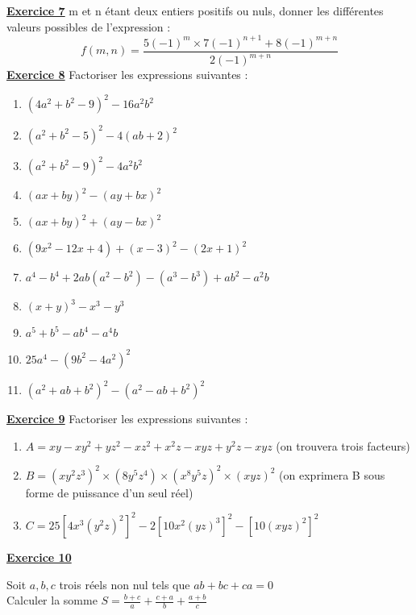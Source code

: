 \documentclass[12pt,a4paper]{article}
\newcommand{\exo}[1]{%
        \textbf{\underline{Exercice #1}}
}
\begin{document}
\exo{7} m et n étant deux entiers positifs ou nuls, donner les différentes valeurs possibles de l’expression :
\[
f(m,n) = \dfrac{5(-1)^m \times 7(-1)^{n+1} + 8(-1)^{m+n}}{2(-1)^{m+n}}
\]
\exo{8} Factoriser les expressions suivantes :
\begin{enumerate}
    \item $(4a^2 + b^2 - 9)^2 - 16a^2b^2$
    
    \item $(a^2 + b^2 - 5)^2 - 4(ab + 2)^2$
    
    \item $(a^2 + b^2 - 9)^2 - 4a^2b^2$
    
    \item $(ax + by)^2 - (ay + bx)^2$
    
    \item $(ax + by)^2 + (ay - bx)^2$
    
    \item $(9x^2 - 12x + 4) + (x - 3)^2 - (2x + 1)^2$
    
    \item $a^4 - b^4 + 2ab(a^2 - b^2) - (a^3 - b^3) + ab^2 - a^2b$
    
    \item $(x + y)^3 - x^3 - y^3$
    
    \item $a^5 + b^5 - ab^4 - a^4b$
    
    \item $25a^4 - (9b^2 - 4a^2)^2$
    
    \item $(a^2 + ab + b^2)^2 - (a^2 - ab + b^2)^2$
\end{enumerate}
\exo{9} Factoriser les expressions suivantes :

\begin{enumerate}
\item $A = xy - xy^2 + yz^2 - xz^2 + x^2z - xyz + y^2z - xyz$ (on trouvera trois facteurs)
    
    \item $B = (xy^2z^3)^2 \times (8y^5z^4) \times (x^8y^5z)^2 \times (xyz)^2$ 
    (on exprimera B sous forme de puissance d'un seul réel)
    
    \item $C = 25[4x^3(y^2z)^2]^2 - 2[10x^2(yz)^3]^2 - [10(xyz)^2]^2$
\end{enumerate}

\exo{10} 
Soit $a, b, c$ trois réels non nul tels que $ab + bc + ca = 0$ \\
Calculer la somme $S=\frac{b+c}{a} + \frac{c+a}{b} + \frac{a+b}{c}$
\end{document}
